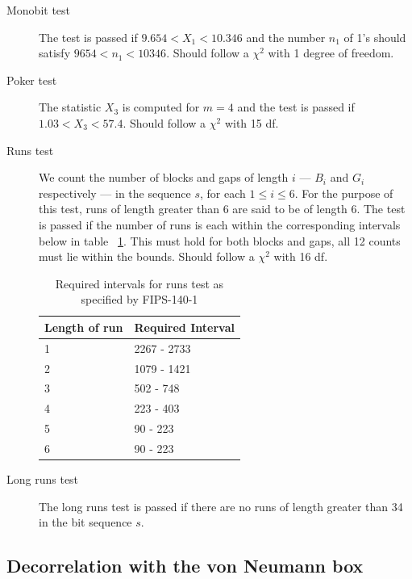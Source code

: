 \documentclass[a4paper]{article}           %
\begin{document}
\begin{description}
\item[Monobit test] The test is passed if $9.654 < X_1 < 10.346$ and the number $n_1$ of 1's should satisfy $9654 < n_1 < 10346$. Should follow a $\chi^2$ with 1 degree of freedom. 
\item[Poker test] The statistic $X_3$ is computed for $m=4$ and the test is passed if $1.03 < X_3 < 57.4$. Should follow a $\chi^2$ with 15 df. 
\item [Runs test] We count the number of blocks and gaps of length $i$ --- $B_i$ and $G_i$ respectively --- in the sequence $s$, for each $1 \leq i \leq 6$. For the purpose of this test, runs of length greater than 6 are said to be of length 6\cite{fips140}. The test is passed if the number of runs is each within the corresponding intervals below in table ~\ref{tab:fipsbounds}. This must hold for both blocks and gaps, all 12 counts must lie within the bounds. Should follow a $\chi^2$ with 16 df. 

  \begin{table}[H]
    \begin{center}
      \begin{tabular}{| l | l |}
        \hline
        Length of run & Required Interval \\
        \hline
        \hline
        1 & 2267 - 2733 \\
        2 & 1079 - 1421 \\
        3 & 502 - 748 \\
        4 & 223 - 403 \\
        5 & 90 - 223 \\
        6 & 90 - 223 \\
        \hline
      \end{tabular}
    \end{center}
    \caption{Required intervals for runs test as specified by FIPS-140-1}
    \label{tab:fipsbounds}
  \end{table}

\item[Long runs test] The long runs test is passed if there are no runs of length greater than 34 in the bit sequence $s$. 
\end{description}

\subsection{Decorrelation with the von Neumann box}
\end{document}
